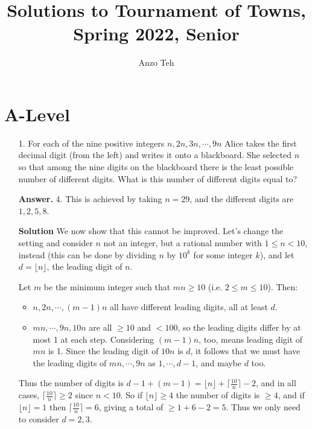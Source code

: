 \documentclass[11pt,a4paper]{article}
\begin{document}
	\newcommand{\la}{\leftarrow}
	\newcommand{\lra}{\leftrightarrow}
	\newcommand{\bbN}{\mathbb{N}}
	\newcommand{\bbZ}{\mathbb{Z}}
	\newcommand{\dsum}{\displaystyle\sum}
	\newcommand{\dprod}{\displaystyle\prod}
	
	
	\title{Solutions to Tournament of Towns, Spring 2022, Senior}
	\author{Anzo Teh}
	\date{}
	\maketitle
	
	\section*{A-Level}
	\begin{enumerate}
		\item[1.] 
		For each of the nine positive integers $n, 2n, 3n, \cdots, 9n$ Alice takes the first decimal digit
		(from the left) and writes it onto a blackboard. She selected $n$ so that among the nine
		digits on the blackboard there is the least possible number of different digits. What is this
		number of different digits equal to?
		
		\textbf{Answer.} 4. This is achieved by taking $n=29$, 
		and the different digits are $1, 2, 5, 8$. 
		
		\textbf{Solution} We now show that this cannot be improved. 
		Let's change the setting and consider $n$ not an integer, 
		but a rational number with $1\le n < 10$, instead (this can be done by dividing $n$ by $10^k$ for some integer $k$), and let $d=\lfloor n\rfloor$, the leading digit of $n$. 
		
		Let $m$ be the minimum integer such that $mn\ge 10$ (i.e. $2\le m\le 10$). Then: 
		\begin{itemize}
			\item $n, 2n, \cdots, (m-1)n$ all have different leading digits, all at least $d$. 
			
			\item $mn, \cdots, 9n, 10n$ are all $\ge 10$ and $<100$, so the leading digits differ by at most 1 at each step. Considering $(m-1)n$, too, means leading digit of $mn$ is 1. 
			Since the leading digit of $10n$ is $d$, it follows that we must have the leading digits of $mn, \cdots, 9n$ as $1, \cdots, d-1$, and maybe $d$ too. 
		\end{itemize}
	    Thus the number of digits is $d-1 + (m-1)=\lfloor n\rfloor + \lceil \frac{10}{n} \rceil - 2$, 
	    and in all cases, $\lceil \frac{10}{n} \rceil\ge 2$ since $n<10$. 
	    So if $\lfloor n\rfloor \ge 4$ the number of digits is $\ge 4$, 
	    and if $\lfloor n\rfloor =1$ then $\lceil \frac{10}{n} \rceil=6$, giving a total of $\ge 1+6-2=5$. 
	    Thus we only need to consider $d=2, 3$. 
	    

\end{enumerate}
\end{document}
